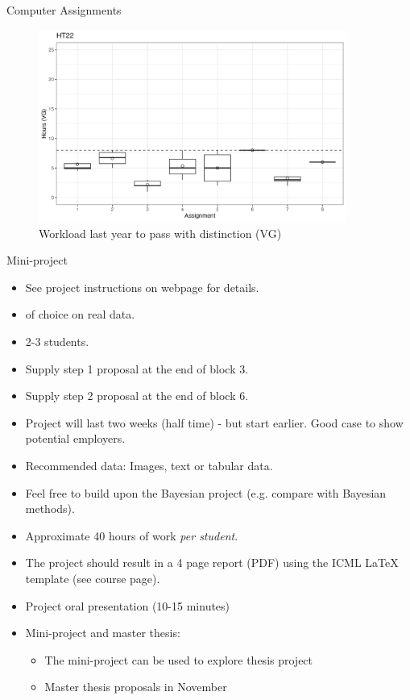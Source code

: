 \documentclass[10pt]{beamer}
\begin{document}
\begin{frame}{Computer Assignments}

\begin{figure}[h]
\caption{Workload last year to pass with distinction (VG)}
\centering
\includegraphics[width=0.9\textwidth]{figs/VG.png}
\end{figure}

\end{frame}


\begin{frame}{Mini-project}

\begin{itemize}
\item See project instructions on webpage for details.\pause
\item {} of choice on real data.
\item 2-3 students.\pause
\item Supply step 1 proposal at the end of block 3.\pause
\item Supply step 2 proposal at the end of block 6.\pause
\item Project will last two weeks (half time) - but start earlier. Good case to show potential employers.
\item Recommended data: Images, text or tabular data.
\item Feel free to build upon the Bayesian project (e.g. compare with Bayesian methods).
\item Approximate 40 hours of work \emph{per student}.\pause
\item The project should result in a 4 page report (PDF) using the ICML LaTeX template (see course page).
\item Project oral presentation (10-15 minutes)\pause
\item Mini-project and master thesis:
\begin{itemize}
\item The mini-project can be used to explore thesis project
\item Master thesis proposals in November
\end{itemize}
\end{itemize}
\end{frame}
\end{document}
